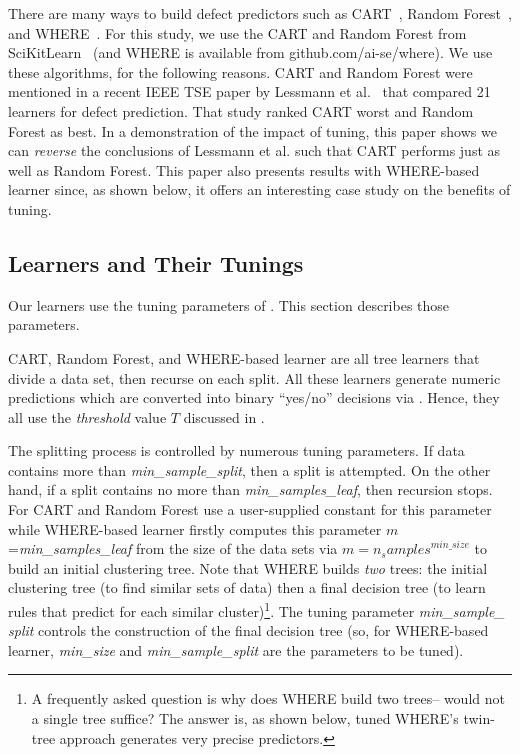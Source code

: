 There are many ways to build defect predictors
such as  CART~\cite{brieman00}, Random Forest~\cite{breiman84}, 
and WHERE~\cite{menzies2013local}.
For this study, we use the CART and Random Forest  from 
SciKitLearn~\cite{scikit-learn} (and
WHERE is available from
github.com/ai-se/where).
 We use  these algorithms, for the following reasons.
CART and Random Forest were mentioned in
a recent IEEE TSE paper by Lessmann et al.~\cite{lessmann2008benchmarking} that compared 21  
learners for  defect prediction.
That study ranked  CART  worst  and Random Forest as best.
In a demonstration of the impact of tuning,
this paper shows  we can {\em reverse} the conclusions of  Lessmann et al. such that CART
performs just as well as
 Random Forest.
This
 paper also presents results with WHERE-based learner since, as shown below,
it offers an interesting case study on the benefits of tuning.
  

\subsection{Learners and Their Tunings}


Our learners use the tuning parameters of . This section describes those parameters.

CART, Random Forest, and WHERE-based learner are all  tree learners that divide a data set, then recurse
on each split.
All these learners
generate numeric predictions which are converted
into binary ``yes/no'' decisions via . Hence, they all use the {\em threshold} value $T$ discussed in .

The splitting process is controlled by numerous tuning parameters.
If data contains more than {\em min\_sample\_split}, then a split is attempted.
On the other hand, if a split contains no more than {\em min\_samples\_leaf}, then recursion stops. For CART and Random Forest use a 
user-supplied constant for this parameter while
WHERE-based learner firstly computes this parameter $m$={\em min\_samples\_leaf} from the size of the data
sets via  $m=\mathit{n_samples}^\mathit{min\_size}$ to build an initial  clustering tree.
Note that WHERE builds {\em two} trees: the initial clustering tree (to find similar sets of data)
then a final decision tree (to learn rules that predict for each similar cluster)\footnote{A
frequently asked question is why does WHERE build two trees--
would not   a single tree suffice? The answer is, as shown below,  tuned WHERE's twin-tree approach 
generates very precise predictors.}.
The tuning parameter  {\em min\_sample\_ split } controls the construction of the
final decision tree (so, for WHERE-based learner,
{\em min\_size} and {\em min\_sample\_split} are the parameters to be tuned).

